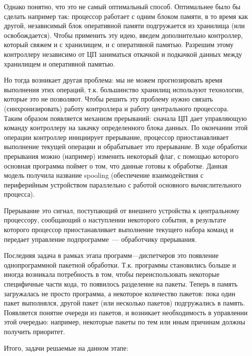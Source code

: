 Однако понятно, что это не самый оптимальный способ. Оптимальнее было бы сделать
например так: процессор работает с одним блоком памяти, в то время как другой,
независимый блок оперативной памяти подгружается из хранилища (или
освобождается). Чтобы применить эту идею, введем дополнительно контроллер,
который свяжем и с хранилищем, и с оперативной памятью. Разрешим этому
контроллеру независимо от ЦП заниматься откачкой и подкачкой данных между
хранилищем и оперативной памятью.

Но тогда возникает другая проблема: мы не можем прогнозировать время выполнения
этих операций, т.к. большинство хранилищ используют технологии, которые это не
позволяют. Чтобы решить эту проблему нужно связать (синхронизировать) работу
контроллера и работу центрального процессора. Таким образом появляется механизм
прерываний: сначала ЦП дает управляющую команду контроллеру на закачку
определенного блока данных. По окончании этой операции контроллер инициирует
прерывание, процессор приостанавливает выполнение текущей операции и
обрабатывает это прерывание. В ходе обработки прерывания можно (например)
изменить некоторый флаг, с помощью которого основная программа поймет о том, что
данные готовы к обработке. Данная модель получила название spooling (обеспечение
взаимодействия с периферийным устройством параллельно с работой основного
вычислительного процесса).

\begin{definition}
  Прерывание это сигнал, поступающий от внешнего устройства к центральному
  процессору, сообщающий о наступлении некоторого события, в результате которого
  процессор приостанавливает выполнение текущего набора команд и передает
  управление подпрограмме~--- обработчику прерывания.
\end{definition}

Последняя задача в рамках этапа программ---диспетчеров это появление
однопрограммной пакетной обработки. Т.к. программы становились больше и иногда
возникала потребность в том, чтобы переиспользовать некоторые специфичные части
кода, то появилось разделение на пакеты. Теперь в память загружалась не просто
программа, а некоторое количество пакетов: пока один пакет выполнялся, другой
пакет (или несколько пакетов) подгружались в память. Появляется понятие очереди
из пакетов, и возникает необходимость в управлении этой очередью: например,
некоторые пакеты по тем или иным причинам должны получить приоритет.

Итого, задачи решаемые на данном этапе:

